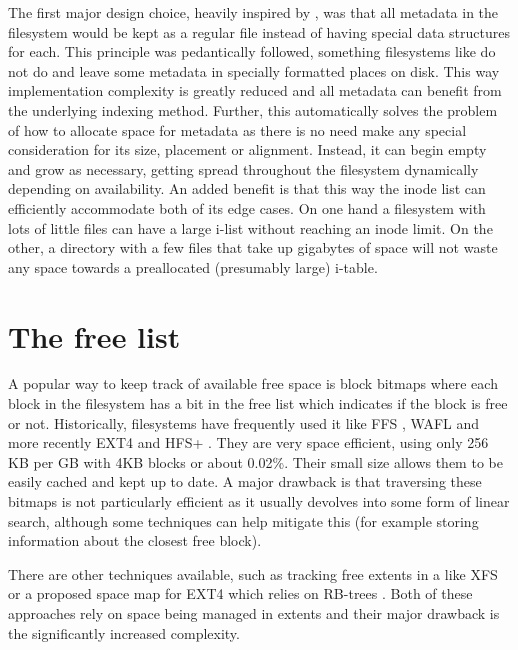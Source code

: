         The first major design choice, heavily inspired by , was
        that all metadata in the filesystem would be kept as a regular file
        instead of having special data structures for each. This principle was
        pedantically followed, something filesystems like 
        do not do and leave some metadata in specially formatted places on
        disk. This way implementation complexity is greatly reduced and all
        metadata can benefit from the underlying indexing method. Further, this
        automatically solves the problem of how to allocate space for metadata
        as there is no need make any special consideration for its
        size, placement or alignment. Instead, it can begin empty and grow as necessary,
        getting spread throughout the filesystem dynamically depending on
        availability. An added benefit is that this way the inode list can
        efficiently accommodate both of its edge cases. On one hand a
        filesystem with lots of little files can have a large i-list without
        reaching an inode limit. On the other, a directory with a few files
        that take up gigabytes of space will not waste any space towards a
        preallocated (presumably large) i-table.

    \section{The free list}
        \label{sec:free_list}

        A popular way to keep track of available free space is block bitmaps
        where each block in the filesystem has a bit in the free list which
        indicates if the block is free or not. Historically, filesystems have
        frequently used it like FFS \cite{FFS}, WAFL \cite{WAFL} and more
        recently EXT4 \cite{ext4_space_maps} and HFS+ \cite{HFSplus}. They are
        very space efficient, using only 256 KB per GB with 4KB blocks or about
        0.02\%. Their small size allows them to be easily cached and kept up to
        date. A major drawback is that traversing these bitmaps is not
        particularly efficient as it usually devolves into some form of linear
        search, although some techniques can help mitigate this (for example
        storing information about the closest free block).

        There are other techniques available, such as tracking free extents in
        a \bplustree{} like XFS \cite{XFS_scalability} or a proposed space map
        for EXT4 which relies on RB-trees \cite{ext4_space_maps}. Both of these
        approaches rely on space being managed in extents and their major drawback is
        the significantly increased complexity.

